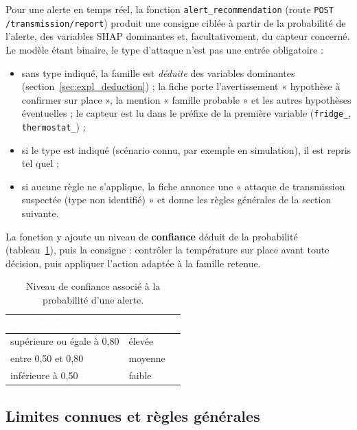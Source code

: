 Pour une alerte en temps réel, la fonction \texttt{alert\_recommendation}
(route \texttt{POST /transmission/report}) produit une consigne ciblée à
partir de la probabilité de l'alerte, des variables SHAP dominantes et,
facultativement, du capteur concerné. Le modèle étant binaire, le type
d'attaque n'est pas une entrée obligatoire :

\begin{itemize}
  \item sans type indiqué, la famille est \emph{déduite} des variables
        dominantes (section~\ref{sec:expl_deduction}) ; la fiche porte
        l'avertissement « hypothèse à confirmer sur place », la mention
        « famille probable » et les autres hypothèses éventuelles ; le
        capteur est lu dans le préfixe de la première variable
        (\texttt{fridge\_}, \texttt{thermostat\_}) ;
  \item si le type est indiqué (scénario connu, par exemple en simulation), il
        est repris tel quel ;
  \item si aucune règle ne s'applique, la fiche annonce une « attaque de
        transmission suspectée (type non identifié) » et donne les règles
        générales de la section suivante.
\end{itemize}

La fonction y ajoute un niveau de \textbf{confiance} déduit de la
probabilité (tableau~\ref{tab:expl_confiance}), puis la consigne : contrôler
la température sur place avant toute décision, puis appliquer l'action
adaptée à la famille retenue.

\begin{table}[H]
\centering
\small
\renewcommand{\arraystretch}{1.3}
\caption{Niveau de confiance associé à la probabilité d'une alerte.}
\label{tab:expl_confiance}
\begin{tabular}{|l|l|}
\hline
\rowcolor{thead}
\textcolor{white}{\textbf{Probabilité}} & \textcolor{white}{\textbf{Confiance}} \\
\hline
supérieure ou égale à 0,80 & élevée \\
\rowcolor{trowa}
entre 0,50 et 0,80 & moyenne \\
inférieure à 0,50 & faible \\
\hline
\end{tabular}
\end{table}

\subsection{Limites connues et règles générales}

